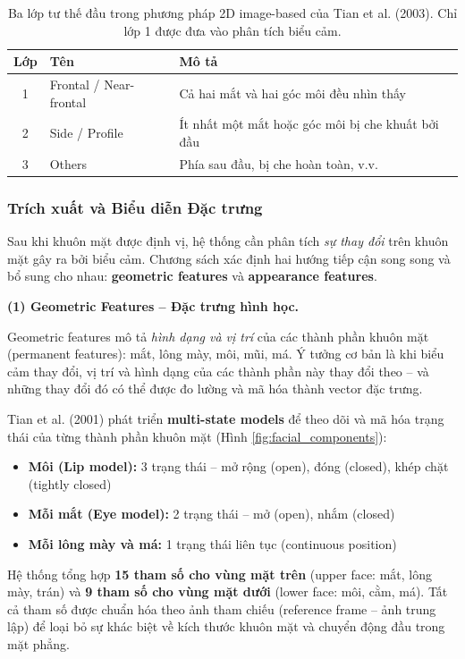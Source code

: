 \documentclass[12pt,a4paper]{article}
\let\oldtextbf\textbf
\renewcommand{\textbf}[1]{\oldtextbf{\textcolor{hcmublue}{#1}}}
\begin{document}
\begin{table}[H]
\centering
\small
\begin{tabular}{|c|l|l|}
\hline
\textbf{Lớp} & \textbf{Tên} & \textbf{Mô tả} \\ \hline
1 & Frontal / Near-frontal & Cả hai mắt và hai góc môi đều nhìn thấy \\ \hline
2 & Side / Profile & Ít nhất một mắt hoặc góc môi bị che khuất bởi đầu \\ \hline
3 & Others & Phía sau đầu, bị che hoàn toàn, v.v. \\ \hline
\end{tabular}
\caption{Ba lớp tư thế đầu trong phương pháp 2D image-based của Tian et al. (2003). Chỉ lớp 1 được đưa vào phân tích biểu cảm.}
\label{tab:head_pose}
\end{table}

\subsubsection{Trích xuất và Biểu diễn Đặc trưng}
\label{subsec:feature_extraction}

Sau khi khuôn mặt được định vị, hệ thống cần phân tích \textit{sự thay đổi} trên khuôn mặt gây ra bởi biểu cảm. Chương sách xác định hai hướng tiếp cận song song và bổ sung cho nhau: \textbf{geometric features} và \textbf{appearance features}.

\textbf{(1) Geometric Features -- Đặc trưng hình học.}

Geometric features mô tả \textit{hình dạng và vị trí} của các thành phần khuôn mặt (permanent features): mắt, lông mày, môi, mũi, má. Ý tưởng cơ bản là khi biểu cảm thay đổi, vị trí và hình dạng của các thành phần này thay đổi theo -- và những thay đổi đó có thể được đo lường và mã hóa thành vector đặc trưng.

Tian et al. (2001) phát triển \textbf{multi-state models} để theo dõi và mã hóa trạng thái của từng thành phần khuôn mặt (Hình \ref{fig:facial_components}):
\begin{itemize}
    \item \textbf{Môi (Lip model):} 3 trạng thái -- mở rộng (open), đóng (closed), khép chặt (tightly closed)
    \item \textbf{Mỗi mắt (Eye model):} 2 trạng thái -- mở (open), nhắm (closed)
    \item \textbf{Mỗi lông mày và má:} 1 trạng thái liên tục (continuous position)
\end{itemize}

Hệ thống tổng hợp \textbf{15 tham số cho vùng mặt trên} (upper face: mắt, lông mày, trán) và \textbf{9 tham số cho vùng mặt dưới} (lower face: môi, cằm, má). Tất cả tham số được chuẩn hóa theo ảnh tham chiếu (reference frame -- ảnh trung lập) để loại bỏ sự khác biệt về kích thước khuôn mặt và chuyển động đầu trong mặt phẳng.
\end{document}
